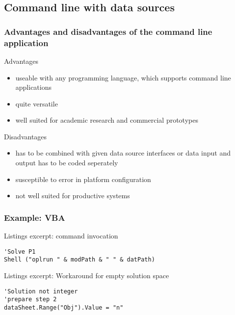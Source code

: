 \subsection{Command line with data sources}
\begin{frame}
 \frametitle{Advantages and disadvantages of the command line application}
 \footnotesize
 \begin{block}{Advantages}
  \begin{itemize}
   \item useable with any programming language, which supports command line applications
   \item quite versatile
   \item well suited for academic research and commercial prototypes
  \end{itemize}
 \end{block}
 \pause
 \begin{block}{Disadvantages}
  \begin{itemize}
   \item has to be combined with given data source interfaces or data input and output has to be coded seperately
   \item susceptible to error in platform configuration
   \item not well suited for productive systems
  \end{itemize}
 \end{block}
\end{frame}

\begin{frame}[fragile]
 \frametitle{Example: VBA}
 \begin{block}{Listings excerpt: command invocation}
  \begin{lstlisting}[language={[Visual]Basic},showstringspaces=false,numbers=none,basicstyle=\scriptsize\ttfamily]
'Solve P1
Shell ("oplrun " & modPath & " " & datPath)
  \end{lstlisting}
 \end{block}
 \begin{block}{Listings excerpt: Workaround for empty solution space}
    \begin{lstlisting}[language={[Visual]Basic},showstringspaces=false]
'Solution not integer
'prepare step 2
dataSheet.Range("Obj").Value = "n"
  \end{lstlisting}
 \end{block}
\end{frame}


